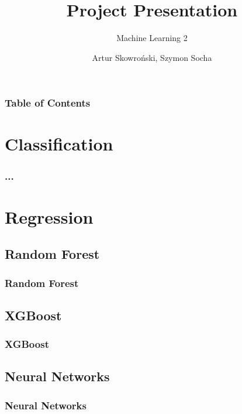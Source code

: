 \documentclass{beamer}
\title[Machine Learining 2 Project Presentation] %
{Project Presentation}
\subtitle{Machine Learning 2}
\author[Artur Skowroński, Szymon Socha] %
{Artur Skowroński, Szymon Socha}
\date[date] %
\begin{document}
\frame{\titlepage}


\begin{frame}
\frametitle{Table of Contents}
\tableofcontents
\end{frame}


\section{Classification}

\begin{frame}
\frametitle{...}

\end{frame}

\section{Regression}

\subsection{Random Forest}
\begin{frame}
\frametitle{Random Forest}

\end{frame}

\subsection{XGBoost}
\begin{frame}
\frametitle{XGBoost}

\end{frame}

\subsection{Neural Networks}
\begin{frame}
\frametitle{Neural Networks}

\end{frame}
\end{document}
